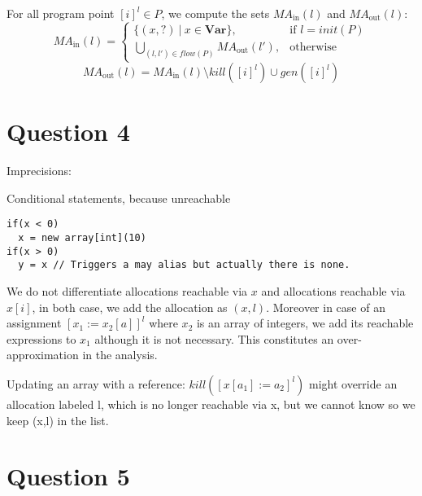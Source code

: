 \documentclass{article}
\begin{document}
For all program point \([i]^l \in P\), we compute the sets \(M\!A_\text{in}(l)\) and \(M\!A_\text{out}(l)\):
 \[
    M\!A_\text{in}(l) =
    \begin{cases}
      \{(x,?)\ |\ x \in \textbf{Var}\},                        & \text{if } l=init(P)\\
      \bigcup\limits_{(l,l') \in flow(P)} M\!A_\text{out}(l'), & \text{otherwise}
    \end{cases}
\]
\[
    M\!A_\text{out}(l) = M\!A_\text{in}(l) \setminus kill([i]^l) \cup gen([i]^l)
\]

\section*{Question 4}
Imprecisions:

Conditional statements, because unreachable 
\begin{lstlisting}
if(x < 0)
  x = new array[int](10)
if(x > 0)
  y = x // Triggers a may alias but actually there is none.
\end{lstlisting}

We do not differentiate allocations reachable via \(x\) and allocations reachable via \(x[i]\), in both case, we add the allocation as \((x,l)\).
Moreover in case of an assignment \([x_1 := x_2[a]]^l\) where \(x_2\) is an array of integers, we add its reachable expressions to \(x_1\) although it is not necessary.
This constitutes an over-approximation in the analysis.

Updating an array with a reference: \( kill([x[a_1] := a_2]^l) \)  might override an allocation labeled l, which is no longer reachable via x, but we cannot know so we keep (x,l) in the list.

\section*{Question 5}
\end{document}
